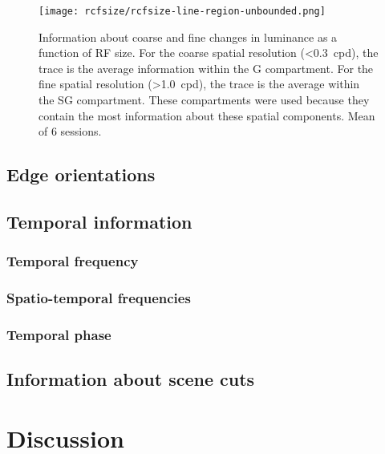 

\begin{figure}[htb]
    \centering
    \texttt{[image: rcfsize/rcfsize-line-region-unbounded.png]}
    \caption{
Information about coarse and fine changes in luminance as a function of \ac{RF} size.
For the coarse spatial resolution (\SI{<0.3}{cpd}), the trace is the average information within the \ac{G} compartment.
For the fine spatial resolution (\SI{>1.0}{cpd}), the trace is the average within the \ac{SG} compartment.
These compartments were used because they contain the most information about these spatial components.
Mean of 6 sessions.
}
\label{fig:lam_rcfsize_trace}
\end{figure}

\subsection{Edge orientations}


\subsection{Temporal information}


\subsubsection{Temporal frequency}


\subsubsection{Spatio-temporal frequencies}


\subsubsection{Temporal phase}


\subsection{Information about scene cuts}


\section{Discussion}
